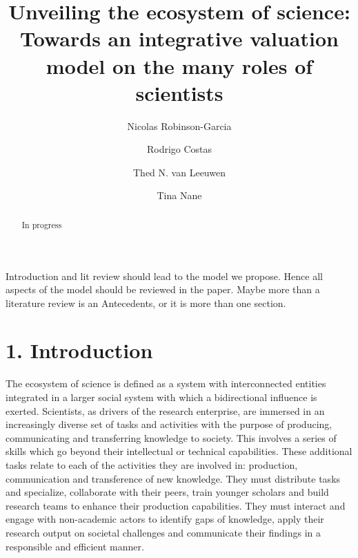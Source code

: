\documentclass[]{elsarticle} %
\begin{document}
\begin{frontmatter}

  \title{Unveiling the ecosystem of science: Towards an integrative valuation
model on the many roles of scientists}
    \author[a]{Nicolas Robinson-Garcia}
    \author[b]{Rodrigo Costas}
  
  
    \author[b]{Thed N. van Leeuwen}
  
  
    \author[a]{Tina Nane}
  
  
      \address[a]{Applied Mathematics (DIAM), TU Delft, Delft, Netherlands}
    \address[b]{CWTS, Leiden University, Leiden, Netherlands}
  
  \begin{abstract}
  In progress
  \end{abstract}
  
 \end{frontmatter}

Introduction and lit review should lead to the model we propose. Hence
all aspects of the model should be reviewed in the paper. Maybe more
than a literature review is an Antecedents, or it is more than one
section.

\hypertarget{introduction}{%
\section{1. Introduction}\label{introduction}}

The ecosystem of science is defined as a system with interconnected
entities integrated in a larger social system with which a bidirectional
influence is exerted. Scientists, as drivers of the research enterprise,
are immersed in an increasingly diverse set of tasks and activities with
the purpose of producing, communicating and transferring knowledge to
society. This involves a series of skills which go beyond their
intellectual or technical capabilities. These additional tasks relate to
each of the activities they are involved in: production, communication
and transference of new knowledge. They must distribute tasks and
specialize, collaborate with their peers, train younger scholars and
build research teams to enhance their production capabilities. They must
interact and engage with non-academic actors to identify gaps of
knowledge, apply their research output on societal challenges and
communicate their findings in a responsible and efficient manner.
\end{document}
